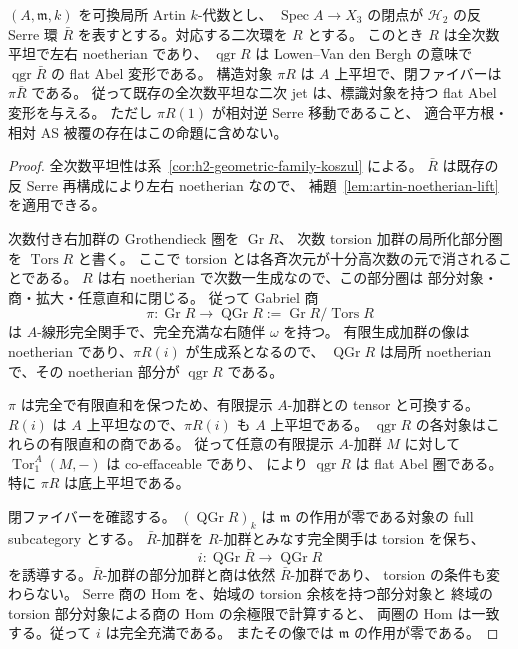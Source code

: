 \begin{proposition}
\label{prop:artin-relations-flat-abelian}
$(A,\mathfrak m,k)$ を可換局所 Artin $k$-代数とし、
$\operatorname{Spec}A\to X_3$ の閉点が $\mathcal H_2$ の反 Serre 環
$\bar R$ を表すとする。対応する二次環を $R$ とする。
このとき $R$ は全次数平坦で左右 noetherian であり、
$\operatorname{qgr}R$ は Lowen--Van den Bergh の意味で
$\operatorname{qgr}\bar R$ の flat Abel 変形である。
構造対象 $\pi R$ は $A$ 上平坦で、閉ファイバーは $\pi\bar R$ である。
従って既存の全次数平坦な二次 jet は、標識対象を持つ flat Abel 変形を与える。
ただし $\pi R(1)$ が相対逆 Serre 移動であること、
適合平方根・相対 AS 被覆の存在はこの命題に含めない。
\end{proposition}
\begin{proof}
全次数平坦性は系~\ref{cor:h2-geometric-family-koszul} による。
$\bar R$ は既存の反 Serre 再構成により左右 noetherian なので、
補題~\ref{lem:artin-noetherian-lift} を適用できる。

次数付き右加群の Grothendieck 圏を $\operatorname{Gr}R$、
次数 torsion 加群の局所化部分圏を $\operatorname{Tors}R$ と書く。
ここで torsion とは各斉次元が十分高次数の元で消されることである。
$R$ は右 noetherian で次数一生成なので、この部分圏は
部分対象・商・拡大・任意直和に閉じる。
従って Gabriel 商
\[
 \pi:\operatorname{Gr}R\longrightarrow\operatorname{QGr}R
 :=\operatorname{Gr}R/\operatorname{Tors}R
\]
は $A$-線形完全関手で、完全充満な右随伴 $\omega$ を持つ。
有限生成加群の像は noetherian であり、$\pi R(i)$ が生成系となるので、
$\operatorname{QGr}R$ は局所 noetherian で、その noetherian 部分が
$\operatorname{qgr}R$ である。

$\pi$ は完全で有限直和を保つため、有限提示 $A$-加群との tensor と可換する。
$R(i)$ は $A$ 上平坦なので、$\pi R(i)$ も $A$ 上平坦である。
$\operatorname{qgr}R$ の各対象はこれらの有限直和の商である。
従って任意の有限提示 $A$-加群 $M$ に対して
$\operatorname{Tor}^A_1(M,-)$ は co-effaceable であり、
\cite[Proposition 3.1, Definition 3.2]{LowenVanDenBergh2006}
により $\operatorname{qgr}R$ は flat Abel 圏である。
特に $\pi R$ は底上平坦である。

閉ファイバーを確認する。
$(\operatorname{QGr}R)_k$ は $\mathfrak m$ の作用が零である対象の full subcategory とする。
$\bar R$-加群を $R$-加群とみなす完全関手は torsion を保ち、
\[
 i:\operatorname{QGr}\bar R\longrightarrow\operatorname{QGr}R
\]
を誘導する。$\bar R$-加群の部分加群と商は依然 $\bar R$-加群であり、
torsion の条件も変わらない。
Serre 商の Hom を、始域の torsion 余核を持つ部分対象と
終域の torsion 部分対象による商の Hom の余極限で計算すると、
両圏の Hom は一致する。従って $i$ は完全充満である。
またその像では $\mathfrak m$ の作用が零である。


\end{proof}
